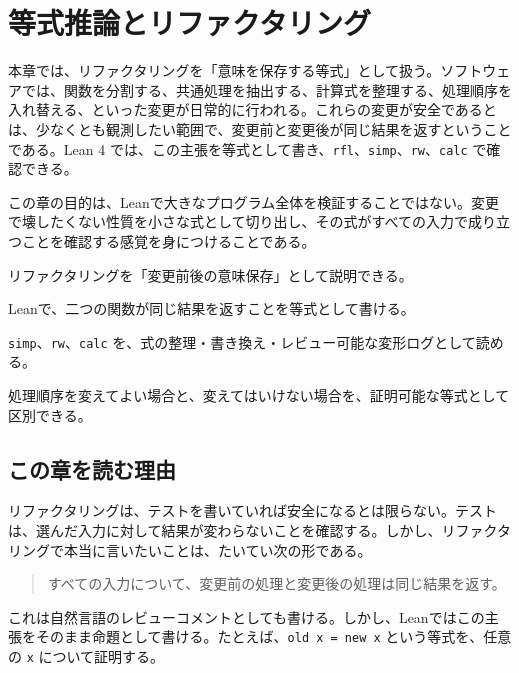 \chapter{等式推論とリファクタリング}
\label{chap:ch03_equality_refactoring}

\begin{chapterabstract}
本章では、リファクタリングを「意味を保存する等式」として扱う。ソフトウェアでは、関数を分割する、共通処理を抽出する、計算式を整理する、処理順序を入れ替える、といった変更が日常的に行われる。これらの変更が安全であるとは、少なくとも観測したい範囲で、変更前と変更後が同じ結果を返すということである。Lean 4 では、この主張を等式として書き、\texttt{rfl}、\texttt{simp}、\texttt{rw}、\texttt{calc} で確認できる。

この章の目的は、Leanで大きなプログラム全体を検証することではない。変更で壊したくない性質を小さな式として切り出し、その式がすべての入力で成り立つことを確認する感覚を身につけることである。
\end{chapterabstract}

\begin{learninggoals}
\item リファクタリングを「変更前後の意味保存」として説明できる。
\item Leanで、二つの関数が同じ結果を返すことを等式として書ける。
\item \texttt{simp}、\texttt{rw}、\texttt{calc} を、式の整理・書き換え・レビュー可能な変形ログとして読める。
\item 処理順序を変えてよい場合と、変えてはいけない場合を、証明可能な等式として区別できる。
\end{learninggoals}

\section{この章を読む理由}

リファクタリングは、テストを書いていれば安全になるとは限らない。テストは、選んだ入力に対して結果が変わらないことを確認する。しかし、リファクタリングで本当に言いたいことは、たいてい次の形である。

\begin{quote}
すべての入力について、変更前の処理と変更後の処理は同じ結果を返す。
\end{quote}

これは自然言語のレビューコメントとしても書ける。しかし、Leanではこの主張をそのまま命題として書ける。たとえば、\texttt{old x = new x} という等式を、任意の \texttt{x} について証明する。

